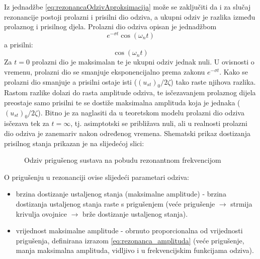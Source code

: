 Iz jednadžbe \eqref{eq:rezonancaOdzivAproksimacija} može se zaključiti da i za
slučaj rezonancije postoji prolazni i prisilni dio odziva, a ukupni odziv je razlika
između prolaznog i prisilnog djela. 
Prolazni dio odziva opisan je jednadžbom
\[
    e^{-\sigma t} \cos(\omega_n t)
\]
a prisilni:
\[
    \cos(\omega_n t)
\]
Za $t=0$ prolazni dio je maksimalan te je ukupni odziv jednak nuli. U ovisnosti o
vremenu, prolazni dio se smanjuje eksponencijalno prema zakonu $e^{-\sigma t}$. Kako
se prolazni dio smanjuje a prisilni ostaje isti ($(u_{st})_0/2\zeta$) tako raste
njihova razlika. Rastom razlike dolazi do rasta amplitude odziva, te isčezavanjem
prolaznog dijela preostaje samo prisilni te se dostiže maksimalna amplituda koja je
jednaka ($(u_{st})_0/2\zeta$). Bitno je za naglasiti da u teoretskom modelu
prolazni dio odziva isčezava tek za $t=\infty$, tj. asimptotski se približava nuli,
ali u realnosti prolazni dio odziva je zanemariv nakon određenog vremena. Shematski
prikaz dostizanja prisilnog stanja prikazan je na slijedećoj slici:
\begin{figure}[H]
     
    \caption{Odziv prigušenog sustava na pobudu rezonantnom frekvencijom}
    \label{fig:rezonanca-priguseno}
\end{figure}

O prigušenju u rezonanciji ovise slijedeći parametari odziva:
\begin{itemize}
    \item brzina dostizanje ustaljenog stanja (maksimalne amplitude) - brzina dostizanja 
        ustaljenog stanja raste s prigušenjem (veće prigušenje $\to$ strmija krivulja
        ovojnice $\to$ brže dostizanje ustaljenog stanja).

    \item vrijednost maksimalne amplitude - obrnuto proporcionalna od vrijednosti
        prigušenja, definirana izrazom \eqref{eq:rezonanca_amplituda}
        (veće prigušenje, manja maksimalna amplituda, vidljivo i u frekvencijskim
        funkcijama odziva).
\end{itemize}

